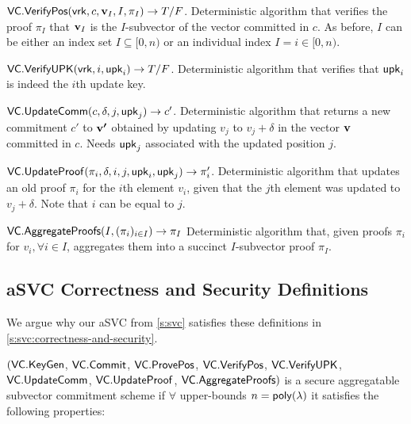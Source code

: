 \api $\mathsf{VC}.\mathsf{VerifyPos}(\mathsf{vrk}, c, \bm{\mathrm{v}}_I, I, \pi_I) \rightarrow T/F$.
Deterministic algorithm that verifies the proof $\pi_I$ that $\bm{\mathrm{v}}_I$ is the $I$-subvector of the vector committed in $c$.
As before, $I$ can be either an index set $I\subseteq [0,n)$ or an individual index $I = i\in [0,n)$.

\api $\mathsf{VC}.\mathsf{VerifyUPK}(\mathsf{vrk}, i, \mathsf{upk}_i) \rightarrow T/F$.
Deterministic algorithm that verifies that $\mathsf{upk}_i$ is indeed the $i$th update key.

\api $\mathsf{VC}.\mathsf{UpdateComm}(c, \delta, j,\mathsf{upk}_j)\rightarrow c'$.
Deterministic algorithm that returns a new commitment $c'$ to $\bm{\mathrm{v'}}$ obtained by updating $v_j$ to $v_j+\delta$ in the vector $\bm{\mathrm{v}}$ committed in $c$.
Needs $\mathsf{upk}_j$ associated with the updated position $j$.

\api $\mathsf{VC}.\mathsf{UpdateProof}(\pi_i, \delta, i, j, \mathsf{upk}_i, \mathsf{upk}_j)\rightarrow \pi'_i$.
Deterministic algorithm that updates an old proof $\pi_i$ for the $i$th element $v_i$, given that the $j$th element was updated to $v_j + \delta$.
Note that $i$ can be equal to $j$.

\api $\mathsf{VC}.\mathsf{AggregateProofs}(I, (\pi_i)_{i\in I})\rightarrow \pi_I$
Deterministic algorithm that, given proofs $\pi_i$ for $v_i,\forall i\in I$, aggregates them into a succinct $I$-subvector proof $\pi_I$.

\subsection{aSVC Correctness and Security Definitions}
\label{s:prelim:vcs:correctness-and-security}

\ifNotCameraReady
We argue why our aSVC from \cref{s:svc} satisfies these definitions in \cref{s:svc:correctness-and-security}.
\fi

\begin{definition}
    \label{def:vc}
    $(\mathsf{VC}.\mathsf{KeyGen}$, $\mathsf{VC}.\mathsf{Commit}$, \ifCameraReady\linebreak[4]\fi$\mathsf{VC}.\mathsf{ProvePos}$, $\mathsf{VC}.\mathsf{VerifyPos}$, $\mathsf{VC}.\mathsf{VerifyUPK}$, $\mathsf{VC}.\mathsf{UpdateComm}$, $\mathsf{VC}.\mathsf{UpdateProof}$, $\mathsf{VC}.\mathsf{AggregateProofs})$ is a secure aggregatable subvector commitment scheme if
    $\forall$ upper-bounds $n=\mathsf{poly}(\lambda)$
    it satisfies the following properties:
\end{definition}

